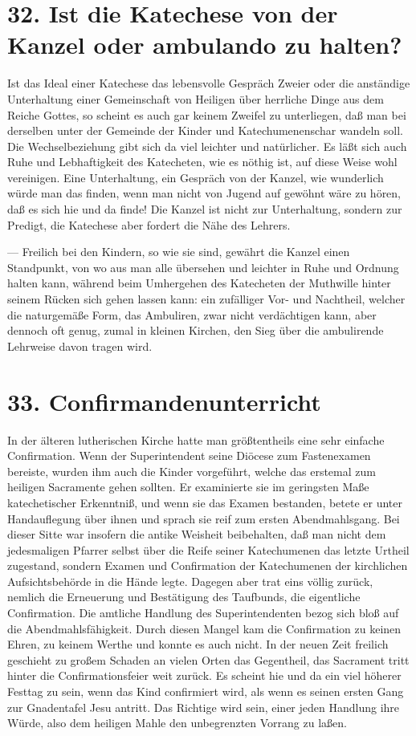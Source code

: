 \section[32. Ist die Katechese von der Kanzel?]{32. Ist die Katechese von der Kanzel oder ambulando zu halten?}

Ist das Ideal einer Katechese das lebensvolle Gespräch Zweier oder die anständige Unterhaltung einer Gemeinschaft von Heiligen über herrliche Dinge aus dem Reiche Gottes, so scheint es auch gar keinem Zweifel zu unterliegen, daß man bei derselben unter der Gemeinde der Kinder und Katechumenenschar wandeln soll. Die Wechselbeziehung gibt sich da
viel leichter und natürlicher. Es läßt sich auch Ruhe und Lebhaftigkeit des Katecheten, wie es nöthig ist, auf diese Weise wohl vereinigen. Eine Unterhaltung, ein Gespräch von der Kanzel, wie wunderlich würde man das finden, wenn man nicht von Jugend auf gewöhnt wäre zu hören, daß es sich hie und da finde! Die Kanzel ist nicht zur Unterhaltung, sondern zur Predigt, die Katechese aber fordert die Nähe des Lehrers.

— Freilich bei den Kindern, so wie sie sind, gewährt die Kanzel einen Standpunkt, von wo aus man alle übersehen und leichter in Ruhe und Ordnung halten kann, während beim Umhergehen des Katecheten der Muthwille hinter seinem Rücken sich gehen lassen kann: ein zufälliger Vor- und Nachtheil, welcher die naturgemäße Form, das Ambuliren, zwar nicht verdächtigen kann, aber dennoch oft genug, zumal in kleinen Kirchen, den Sieg über die ambulirende Lehrweise davon tragen wird.

\section{33. Confirmandenunterricht}

In der älteren lutherischen Kirche hatte man größtentheils eine sehr einfache Confirmation. Wenn der Superintendent seine Diöcese zum Fastenexamen bereiste, wurden ihm auch die Kinder vorgeführt, welche das erstemal zum heiligen Sacramente gehen sollten. Er examinierte sie im geringsten Maße katechetischer Erkenntniß, und wenn sie das Examen bestanden, betete er unter Handauflegung über ihnen und sprach sie reif zum ersten Abendmahlsgang. Bei dieser Sitte war
insofern die antike Weisheit beibehalten, daß man nicht dem jedesmaligen Pfarrer selbst über die Reife seiner Katechumenen das letzte Urtheil zugestand, sondern Examen und Confirmation der Katechumenen der kirchlichen Aufsichtsbehörde in die Hände legte. Dagegen aber trat eins völlig zurück, nemlich die Erneuerung und Bestätigung des Taufbunds, die eigentliche Confirmation. Die amtliche Handlung des Superintendenten bezog sich bloß auf die Abendmahlsfähigkeit. Durch diesen Mangel kam die Confirmation zu keinen Ehren, zu keinem Werthe und konnte es auch nicht. In der neuen Zeit freilich geschieht zu großem Schaden an vielen Orten das Gegentheil, das Sacrament tritt hinter die Confirmationsfeier weit zurück. Es scheint hie und da ein viel höherer Festtag zu sein, wenn das Kind confirmiert wird, als wenn es seinen ersten Gang zur Gnadentafel Jesu antritt. Das Richtige wird sein, einer jeden Handlung ihre Würde, also dem heiligen Mahle den unbegrenzten Vorrang zu laßen.

